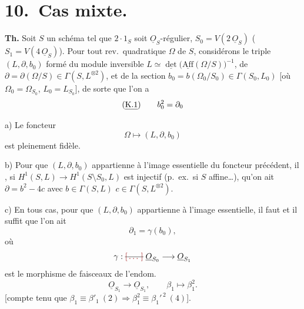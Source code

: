 \documentclass[11pt,a4paper]{article}
\begin{document}

\section*{10.\ Cas mixte.}

\textbf{Th.} Soit $S$ un schéma tel que $2 \cdot 1_S$ soit $\underline{O}_S$-régulier,
 $S_0 = V(2\,\underline{O}_S)$ ($S_1 = V(4\,\underline{O}_S)$).
Pour tout rev.\ quadratique $\Omega$ de $S$, considérons le triple $(L, \partial, b_0)$
formé du module inversible
$L \simeq \underline{\det}\bigl(\underline{\mathrm{Aff}}(\Omega/S)\bigr)^{-1}$, de
$\partial = \partial(\Omega/S) \in \Gamma(S, L^{\otimes 2})$, et de la section
$b_0 = b(\Omega_0/S_0) \in \Gamma(S_0, L_0)$
[où $\Omega_0 = \Omega_{S_0}$, $L_0 = L_{S_0}$], de sorte que l'on a
\[
(\text{\uncertain{K.1}})\qquad b_0^2 = \partial_0
\]

a) Le foncteur 
\[
\Omega \longmapsto (L, \partial, b_0)
\]
est pleinement fidèle.

b)  Pour que $(L, \partial, b_0)$ appartienne à l'image
essentielle du foncteur précédent, il  ,
  si $H^1(S, L) \to H^1(S \setminus S_0, L)$ est injectif
(p.\ ex.\ si $S$ affine\ldots),
qu'on ait $\partial = b^2 - 4c$ avec $b \in \Gamma(S, L)$ 
$c \in \Gamma(S, L^{\otimes 2})$.

c) En tous cas, pour que $(L, \partial, b_0)$ appartienne à l'image essentielle, il faut et il
suffit que l'on ait
\[
\partial_1 = \gamma(b_0),
\]
où
\[
\gamma : \text{\struck{\ill{}}}\; \underline{O}_{S_0} \longrightarrow \underline{O}_{S_1}
\]
est le morphisme de faisceaux   de l'endom.
\[
\underline{O}_{S_1} \longrightarrow \underline{O}_{S_1}, \qquad \beta_1 \longmapsto \beta_1^2 .
\]
[compte tenu que $\beta_1 \equiv \beta'_1 \ (2) \Rightarrow \beta_1^2 \equiv \beta_1'^{\,2} \ (4)$].

\end{document}
